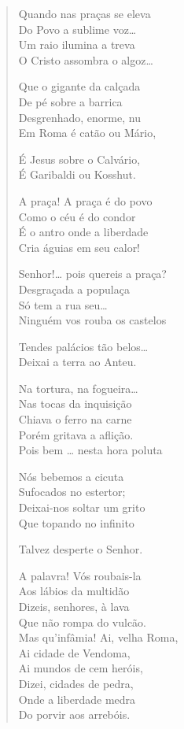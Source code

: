 \begin{verse}
Quando nas praças se eleva \\
Do Povo a sublime voz… \\
Um raio ilumina a treva \\
O Cristo assombra o algoz…
					
Que o gigante da calçada \\
De pé sobre a barrica \\
Desgrenhado, enorme, nu \\
Em Roma é catão ou Mário, 
					
É Jesus sobre o Calvário, \\
É Garibaldi ou Kosshut.
					
A praça! A praça é do povo \\
Como o céu é do condor\\
É o antro onde a liberdade \\
Cria águias em seu calor! 
					
Senhor!… pois quereis a praça? \\
Desgraçada a populaça \\
Só tem a rua seu… \\
Ninguém vos rouba os castelos
					
Tendes palácios tão belos… \\
Deixai a terra ao Anteu.
					
Na tortura, na fogueira… \\
Nas tocas da inquisição \\
Chiava o ferro na carne \\
Porém gritava a aflição. \\
Pois bem … nesta hora poluta 
					
Nós bebemos a cicuta \\
Sufocados no estertor; \\
Deixai-nos soltar um grito\\
Que topando no infinito 
					
Talvez desperte o Senhor. 
					
A palavra! Vós roubais-la \\
Aos lábios da multidão \\
Dizeis, senhores, à lava \\
Que não rompa do vulcão.\\
Mas qu’infâmia! Ai, velha Roma, \\
Ai cidade de Vendoma, \\
Ai mundos de cem heróis,\\
Dizei, cidades de pedra,\\
Onde a liberdade medra\\
Do porvir aos arrebóis.
					

\end{verse}
